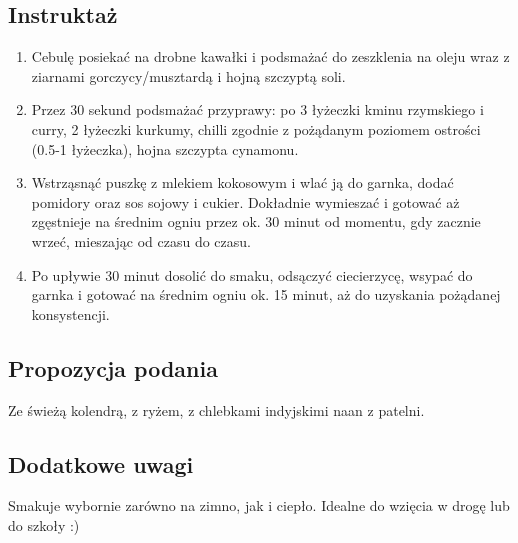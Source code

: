 \subsection*{Instruktaż} \begin{enumerate} \item Cebulę posiekać na drobne kawałki i podsmażać do zeszklenia na oleju wraz z ziarnami gorczycy/musztardą i hojną szczyptą soli. \item Przez 30 sekund podsmażać przyprawy: po 3 łyżeczki kminu rzymskiego i curry, 2 łyżeczki kurkumy, chilli zgodnie z pożądanym poziomem ostrości (0.5-1 łyżeczka), hojna szczypta cynamonu. \item Wstrząsnąć puszkę z mlekiem kokosowym i wlać ją do garnka, dodać pomidory oraz sos sojowy i cukier. Dokładnie wymieszać i gotować aż zgęstnieje na średnim ogniu przez ok. 30 minut od momentu, gdy zacznie wrzeć, mieszając od czasu do czasu. \item Po upływie 30 minut dosolić do smaku, odsączyć ciecierzycę, wsypać do garnka i gotować na średnim ogniu ok. 15 minut, aż do uzyskania pożądanej konsystencji. \end{enumerate}

\vspace{0.5cm}

\small \subsection*{Propozycja podania} Ze świeżą kolendrą, z ryżem, z chlebkami indyjskimi naan z patelni.

\vspace{0.3cm}

\subsection*{Dodatkowe uwagi} Smakuje wybornie zarówno na zimno, jak i ciepło. Idealne do wzięcia w drogę lub do szkoły :)

\newpage
